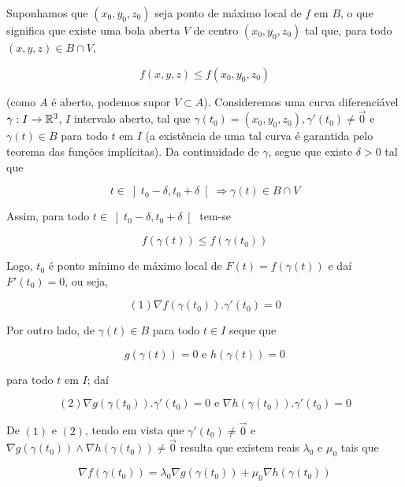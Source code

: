 \documentclass{book}
\begin{document}
\begin{dem}
Suponhamos que $\left( {x_0 ,y_0 ,z_0 } \right)$ seja ponto de m\'aximo local de $f$ em $B$, o que significa que existe uma bola aberta $V$ de centro $\left( {x_0 ,y_0 ,z_0 } \right)$ tal que, para todo $\left( {x,y,z} \right) \in B \cap V$,

\[
f\left( {x,y,z} \right) \leqslant f\left( {x_0 ,y_0 ,z_0 } \right)
\]

(como $A$ \'e aberto, podemos supor $V \subset A$). Consideremos uma curva diferenci\'avel $\gamma :I \to \mathbb{R}^3$, $I$ intervalo aberto, tal que $\gamma \left( {t_0 } \right) = \left( {x_0 ,y_0 ,z_0 } \right),\gamma '\left( {t_0 } \right) \ne \overrightarrow 0$ e $\gamma \left( t \right) \in B$ para todo $t$ em $I$ (a exist\^encia de uma tal curva \'e garantida pelo teorema das fun\c c\~oes impl\'icitas). Da continuidade de $\gamma$, segue que existe $\delta > 0$ tal que

\[
t \in \left] {t_0  - \delta ,t_0  + \delta } \right[ \Rightarrow \gamma \left( t \right) \in B \cap V
\]

Assim, para todo $t \in \left] {t_0  - \delta ,t_0  + \delta } \right[$ tem-se

\[
f\left( {\gamma \left( t \right)} \right) \leqslant f\left( {\gamma \left( {t_0 } \right)} \right)
\]

Logo, $t_0$ \'e ponto m\'inimo de m\'aximo local de $F\left( t \right) = f\left( {\gamma \left( t \right)} \right)$ e da\'i $F'\left( {t_0 } \right) = 0$, ou seja,

\[
\left( 1 \right)\nabla f\left( {\gamma \left( {t_0 } \right)} \right).\gamma '\left( {t_0 } \right) = 0
\]

Por outro lado, de $\gamma \left( t \right) \in B$ para todo $t \in I$ seque que

\[
g\left( {\gamma \left( t \right)} \right) = 0{\text{ e }}h\left( {\gamma \left( t \right)} \right) = 0
\]

para todo $t$ em $I$; da\'i

\[
\left( 2 \right)\nabla g\left( {\gamma \left( {t_0 } \right)} \right).\gamma '\left( {t_0 } \right) = 0{\text{ e }}\nabla h\left( {\gamma \left( {t_0 } \right)} \right).\gamma '\left( {t_0 } \right) = 0
\]

De $(1)$ e $(2)$, tendo em vista que $\gamma '\left( {t_0 } \right) \ne \overrightarrow 0$ e $\nabla g\left( {\gamma \left( {t_0 } \right)} \right) \wedge \nabla h\left( {\gamma \left( {t_0 } \right)} \right) \ne \overrightarrow 0$ resulta que existem reais $\lambda _0$ e $\mu _0$ tais que

\[
\nabla f\left( {\gamma \left( {t_0 } \right)} \right) = \lambda _0 \nabla g\left( {\gamma \left( {t_0 } \right)} \right) + \mu _0 \nabla h\left( {\gamma \left( {t_0 } \right)} \right)
\]


\end{dem}
\end{document}
